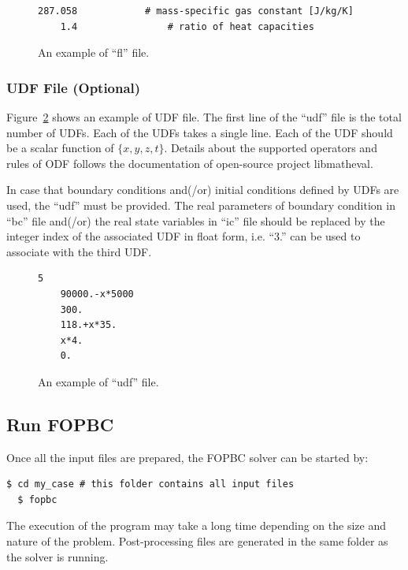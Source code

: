 \documentclass[]{article}
\begin{document}
\begin{figure}[h!]
  \begin{lstlisting}[backgroundcolor=\color{lightgray}]
    287.058            # mass-specific gas constant [J/kg/K]
    1.4                # ratio of heat capacities
  \end{lstlisting}
  \caption{An example of ``fl'' file.}
  \label{lst:fl}
\end{figure}

\subsubsection{UDF File (Optional)}

Figure~\ref{lst:udf} shows an example of UDF file.
The first line of the ``udf'' file is the total number of UDFs.
Each of the UDFs takes a single line.
Each of the UDF should be a scalar function of $\{x,y,z,t\}$.
Details about the supported operators and rules of ODF follows the documentation of open-source
project libmatheval.

In case that boundary conditions and(/or) initial conditions defined by UDFs are used, the ``udf''
must be provided.
The real parameters of boundary condition in ``bc'' file and(/or) the real state variables in ``ic''
file should be replaced by the integer index of the associated UDF in float form, i.e. ``3.'' can be
used to associate with the third UDF.

\begin{figure}[h!]
  \begin{lstlisting}[backgroundcolor=\color{lightgray}]
    5
    90000.-x*5000
    300.
    118.+x*35.
    x*4.
    0.
  \end{lstlisting}
  \caption{An example of ``udf'' file.}
  \label{lst:udf}
\end{figure}

\subsection{Run FOPBC}

Once all the input files are prepared, the FOPBC solver can be started by:
\begin{lstlisting}[backgroundcolor=\color{lightgray}]
  $ cd my_case # this folder contains all input files
  $ fopbc
\end{lstlisting}
The execution of the program may take a long time depending on the size and nature of the problem.
Post-processing files are generated in the same folder as the solver is running.
\end{document}
